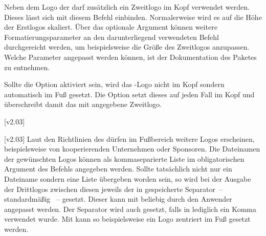 \begin{DeclareEntity*}{}
\begin{DeclareEntity*}{}
\begin{DeclareEntity*}{}
\begin{Declaration}
  {}
Neben dem Logo der \TnUD darf zusätzlich ein Zweitlogo im Kopf verwendet 
werden. Dieses lässt sich mit diesem Befehl einbinden. Normalerweise wird es 
auf die Höhe der Erstlogos skaliert. Über das optionale Argument können weitere 
Formatierungsparameter an den darunterliegend verwendeten Befehl 
 durchgereicht werden, um beispielsweise die Größe des 
Zweitlogos anzupassen. Welche Parameter angepasst werden können, ist der 
Dokumentation des Paketes  zu entnehmen.

Sollte die Option  aktiviert sein, wird das \DDC-Logo nicht im Kopf 
sondern automatisch im Fuß gesetzt. Die Option  setzt dieses 
auf jeden Fall im Kopf und überschreibt damit das mit  
angegebene Zweitlogo.
\end{Declaration}

\begin{Declaration}
  {}
  [v2.03]
\begin{Declaration}
  {}
  [v2.03]
%
Laut den Richtlinien des \CDs dürfen im Fußbereich weitere Logos erscheinen, 
beispielsweise von kooperierenden Unternehmen oder Sponsoren. Die Dateinamen 
der gewünschten Logos können als kommaseparierte Liste im obligatorischen 
Argument des Befehls  angegeben werden. Sollte tatsächlich 
nicht nur ein Dateiname sondern eine Liste übergeben worden sein, so wird bei 
der Ausgabe der Drittlogos zwischen diesen jeweils der in  
gespeicherte Separator~-- standardmäßig ~-- gesetzt. Dieser kann 
mit  
beliebig durch den Anwender angepasst werden. Der Separator wird auch gesetzt, 
falls in  lediglich ein Komma verwendet wurde. Mit 
 kann so beispielsweise ein 
Logo zentriert im Fuß gesetzt werden.


\end{Declaration}
\end{Declaration}
\end{DeclareEntity*}
\end{DeclareEntity*}
\end{DeclareEntity*}
